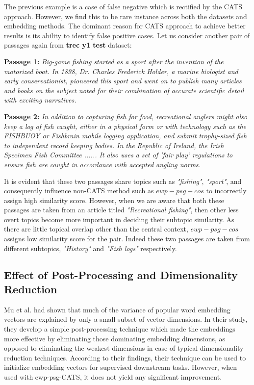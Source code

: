 The previous example is a case of false negative which is rectified by the CATS approach. However, we find this to be rare instance across both the datasets and embedding methods. The dominant reason for CATS approach to achieve better results is its ability to identify false positive cases. Let us consider another pair of passages again from \textbf{trec y1 test} dataset:

\textbf{Passage 1: } \textit{Big-game fishing started as a sport after the invention of the motorized boat.  In 1898, Dr. Charles Frederick Holder, a marine biologist and early conservationist, pioneered this sport and went on to publish many articles and books on the subject noted for their combination of accurate scientific detail with exciting narratives.}

\textbf{Passage 2: } \textit{In addition to capturing fish for food, recreational anglers might also keep a log of fish caught, either in a physical form or with technology such as the FISHBUOY or Fishbrain mobile logging application, and submit trophy-sized fish to independent record keeping bodies. In the Republic of Ireland, the Irish Specimen Fish Committee ...... It also uses a set of 'fair play' regulations to ensure fish are caught in accordance with accepted angling norms.}

It is evident that these two passages share topics such as \textit{"fishing"}, \textit{"sport"}, and consequently influence non-CATS method such as $ewp-psg-cos$ to incorrectly assign high similarity score. However, when we are aware that both these passages are taken from an article titled \textit{"Recreational fishing"}, then other less overt topics become more important in deciding their subtopic similarity. As there are little topical overlap other than the central context, $ewp-psg-cos$ assigns low similarity score for the pair. Indeed these two passages are taken from different subtopics, \textit{"History"} and \textit{"Fish logs"} respectively. 

\subsection{Effect of Post-Processing and Dimensionality Reduction}
Mu et al. \cite{mu2017all} had shown that much of the variance of popular word embedding vectors are explained by only a small subset of vector dimensions. In their study, they develop a simple post-processing technique which made the embeddings more effective by eliminating those dominating embedding dimensions, as opposed to eliminating the weakest dimensions in case of typical dimensionality reduction techniques. According to their findings, their technique can be used to initialize embedding vectors for supervised downstream tasks. However, when used with ewp-psg-CATS, it does not yield any significant improvement.

